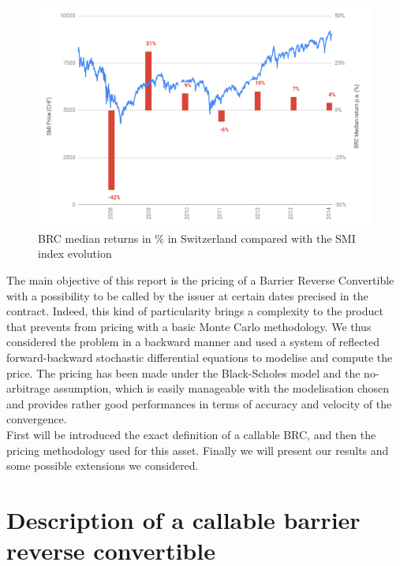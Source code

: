\documentclass[a4paper,11pt,english]{book}
\begin{document}
\begin{figure}[H] 
    \centering
    \includegraphics[scale=0.4]{images/BRC_median_return.png} 
    \caption{BRC median returns in \% in Switzerland compared with the SMI index evolution}
    \label{fig:median-returns-BRC}
\end{figure}

The main objective of this report is the pricing of a Barrier Reverse Convertible with a possibility to be called by the issuer at certain dates precised in the contract. Indeed, this kind of particularity brings a complexity to the product that prevents from pricing with a basic Monte Carlo methodology. We thus considered the problem in a backward manner and used a system of reflected forward-backward stochastic differential equations to modelise and compute the price. The pricing has been made under the Black-Scholes model and the no-arbitrage assumption, which is easily manageable with the modelisation chosen and provides rather good performances in terms of accuracy and velocity of the convergence. \\

First will be introduced the exact definition of a callable BRC, and then the pricing methodology used for this asset. Finally we will present our results and some possible extensions we considered.  




\pagestyle{fancy}

\chapter{Description of a callable barrier reverse convertible}
\end{document}
